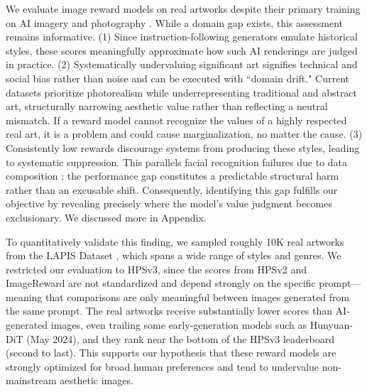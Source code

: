 We evaluate image reward models on real artworks despite their primary training on AI imagery and photography \cite{ma_hpsv3_2025}. While a domain gap exists, this assessment remains informative. (1) Since instruction-following generators emulate historical styles, these scores meaningfully approximate how such AI renderings are judged in practice. (2) Systematically undervaluing significant art signifies technical and social bias rather than noise and can be executed with ``domain drift." Current datasets prioritize photorealism \cite{ma_hpsv3_2025} while underrepresenting traditional and abstract art, structurally narrowing aesthetic value rather than reflecting a neutral mismatch. If a reward model cannot recognize the values of a highly respected real art, it is a problem and could cause marginalization, no matter the cause. (3) Consistently low rewards discourage systems from producing these styles, leading to systematic suppression. This parallels facial recognition failures due to data composition \cite{buolamwini_gender_2018}; the performance gap constitutes a predictable structural harm rather than an excusable shift. Consequently, identifying this gap fulfills our objective by revealing precisely where the model's value judgment becomes exclusionary. We discussed more in Appendix.




To quantitatively validate this finding, we sampled roughly 10K real artworks from the LAPIS Dataset \cite{maerten_lapis_2025}, which spans a wide range of styles and genres. We restricted our evaluation to HPSv3, since the scores from HPSv2 and ImageReward are not standardized and depend strongly on the specific prompt—meaning that comparisons are only meaningful between images generated from the same prompt. The real artworks receive substantially lower scores than AI-generated images, even trailing some early-generation models such as Hunyuan-DiT (May 2024), and they rank near the bottom of the HPSv3 leaderboard (second to last). This supports our hypothesis that these reward models are strongly optimized for broad human preferences and tend to undervalue non-mainstream aesthetic images.


